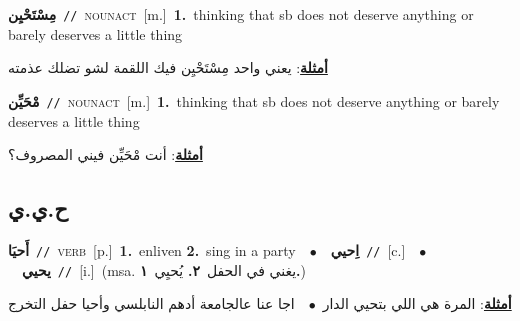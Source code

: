 \documentclass[10pt,a4paper,twoside]{article} %
\begin{document}
\begin{multicols}{2}
{\setlength\topsep{0pt}\textbf{\foreignlanguage{arabic}{مِسْتَحْيِن}}\ {\color{gray}\texttt{//}\color{black}}\ \textsc{noun\textunderscore act}\ [m.]\ \textbf{1.}~thinking that sb does not deserve anything or barely deserves a little thing\  \begin{flushright}\color{gray}\foreignlanguage{arabic}{\textbf{\underline{\foreignlanguage{arabic}{أمثلة}}}: يعني واحد مِسْتَحْيِن فيك اللقمة لشو تضلك عذمته}\end{flushright}\color{black}} \vspace{2mm}

{\setlength\topsep{0pt}\textbf{\foreignlanguage{arabic}{مْحَيِّن}}\ {\color{gray}\texttt{//}\color{black}}\ \textsc{noun\textunderscore act}\ [m.]\ \textbf{1.}~thinking that sb does not deserve anything or barely deserves a little thing\  \begin{flushright}\color{gray}\foreignlanguage{arabic}{\textbf{\underline{\foreignlanguage{arabic}{أمثلة}}}: أنت مْحَيِّن فيني المصروف؟}\end{flushright}\color{black}} \vspace{2mm}

\vspace{-3mm}
\subsection*{\color{blue}\foreignlanguage{arabic}{ح.ي.ي}\color{blue}{}} 

{\setlength\topsep{0pt}\textbf{\foreignlanguage{arabic}{أَحيَا}}\ {\color{gray}\texttt{//}\color{black}}\ \textsc{verb}\ [p.]\ \textbf{1.}~enliven  \textbf{2.}~sing in a party\ \ $\bullet$\ \ \setlength\topsep{0pt}\textbf{\foreignlanguage{arabic}{اِحيي}}\ {\color{gray}\texttt{//}\color{black}}\ [c.]\ \ $\bullet$\ \ \setlength\topsep{0pt}\textbf{\foreignlanguage{arabic}{يحيي}}\ {\color{gray}\texttt{//}\color{black}}\ [i.]\ \color{gray}(msa. \foreignlanguage{arabic}{يغني في الحفل}~\foreignlanguage{arabic}{\textbf{٢.}}  \foreignlanguage{arabic}{يُحيِي}~\foreignlanguage{arabic}{\textbf{١.}})\color{black}\  \begin{flushright}\color{gray}\foreignlanguage{arabic}{\textbf{\underline{\foreignlanguage{arabic}{أمثلة}}}: المرة هي اللي بتحيي الدار\ $\bullet$\ \  اجا عنا عالجامعة أدهم النابلسي وأحيا حفل التخرج}\end{flushright}\color{black}} \vspace{2mm}


\end{multicols}
\end{document}
